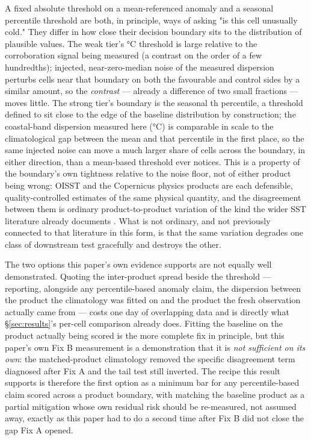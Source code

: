  A fixed
absolute threshold on a mean-referenced anomaly and a seasonal percentile
threshold are both, in principle, ways of asking "is this cell unusually
cold." They differ in how close their decision boundary sits to the
distribution of plausible values. The weak tier's \CoolAnomalyThreshold{}\si{\celsius}
threshold is large relative to the corroboration signal being measured (a
contrast on the order of a few hundredths); injected, near-zero-median noise
of the measured dispersion perturbs cells near that boundary on both the
favourable and control sides by a similar amount, so the \emph{contrast} ---
already a difference of two small fractions --- moves little. The strong
tier's boundary is the seasonal \ClimPercentile{}th percentile, a threshold
defined to sit close to the edge of the baseline distribution by
construction; the coastal-band dispersion measured here
(\DisagCoastalSD{}\si{\celsius}) is comparable in scale to the climatological
gap between the mean and that percentile in the first place, so the same
injected noise can move a much larger share of cells across the boundary, in
either direction, than a mean-based threshold ever notices. This is a
property of the boundary's own tightness relative to the noise floor, not of
either product being wrong: OISST and the Copernicus physics products are
each defensible, quality-controlled estimates of the same physical quantity,
and the disagreement between them is ordinary product-to-product variation
of the kind the wider SST literature already documents \citep{reynolds2010}.
What is not ordinary, and not previously connected to that literature in this
form, is that the same variation degrades one class of downstream test
gracefully and destroys the other.

 The two options this paper's own evidence supports
are not equally well demonstrated. Quoting the inter-product spread beside
the threshold --- reporting, alongside any percentile-based anomaly claim,
the dispersion between the product the climatology was fitted on and the
product the fresh observation actually came from --- costs one day of
overlapping data and is directly what \S\ref{sec:results}'s per-cell
comparison already does. Fitting the baseline on the product actually being
scored is the more complete fix in principle, but this paper's own Fix B
measurement is a demonstration that it is \emph{not sufficient on its own}:
the matched-product climatology removed the specific disagreement term
diagnosed after Fix A and the tail test still inverted. The recipe this
result supports is therefore the first option as a minimum bar for any
percentile-based claim scored across a product boundary, with matching the
baseline product as a partial mitigation whose own residual risk should be
re-measured, not assumed away, exactly as this paper had to do a second time
after Fix B did not close the gap Fix A opened.

